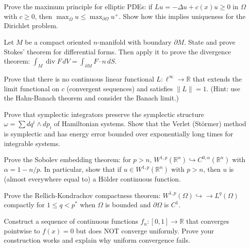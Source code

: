 \documentclass[12pt,a4paper]{exam}
\begin{document}
\begin{questions}
\question[4]
Prove the maximum principle for elliptic PDEs: if $Lu = -\Delta u + c(x) u \geq 0$ in $\Omega$ with $c \geq 0$, then $\max_{\overline{\Omega}} u \leq \max_{\partial\Omega} u^+$. Show how this implies uniqueness for the Dirichlet problem.

\vspace{0.3cm}

\question[2]
Let $M$ be a compact oriented $n$-manifold with boundary $\partial M$. State and prove Stokes' theorem for differential forms. Then apply it to prove the divergence theorem: $\int_M \operatorname{div} F \, dV = \int_{\partial M} F \cdot n \, dS$.

\vspace{0.3cm}

\question[4]
Prove that there is no continuous linear functional $L: \ell^\infty \to \mathbb{R}$ that extends the limit functional on $c$ (convergent sequences) and satisfies $\|L\| = 1$. (Hint: use the Hahn-Banach theorem and consider the Banach limit.)

\vspace{0.3cm}

\question[3]
Prove that symplectic integrators preserve the symplectic structure $\omega = \sum dq^i \wedge dp_i$ of Hamiltonian systems. Show that the Verlet (St\"ormer) method is symplectic and has energy error bounded over exponentially long times for integrable systems.

\vspace{0.3cm}

\question[6]
Prove the Sobolev embedding theorem: for $p > n$, $W^{1,p}(\mathbb{R}^n) \hookrightarrow C^{0,\alpha}(\mathbb{R}^n)$ with $\alpha = 1 - n/p$. In particular, show that if $u \in W^{1,p}(\mathbb{R}^n)$ with $p > n$, then $u$ is (almost everywhere equal to) a H\"older continuous function.

\vspace{0.3cm}

\question[3]
Prove the Rellich-Kondrachov compactness theorem: $W^{1,p}(\Omega) \hookrightarrow\!\!\!\to L^q(\Omega)$ compactly for $1 \leq q < p^*$ when $\Omega$ is bounded and $\partial\Omega$ is $C^1$.

\vspace{0.3cm}

\question[5]
Construct a sequence of continuous functions $f_n: [0,1] \to \mathbb{R}$ that converges pointwise to $f(x) = 0$ but does NOT converge uniformly. Prove your construction works and explain why uniform convergence fails.


\end{questions}
\end{document}
